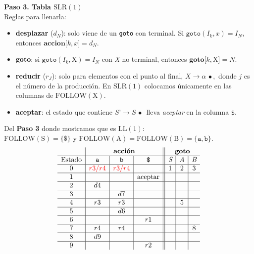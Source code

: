 \documentclass[12pt,letterpaper]{article}
\newcommand{\nt}[1]{\textit{#1}}
\newcommand{\tk}[1]{\texttt{#1}}
\newcommand{\tx}[1]{\text{#1}}
\newcommand{\Follow}[1]{\mathrm{FOLLOW}(#1)}
\renewcommand{\ll}{\mathrm{LL(1)}}
\newcommand{\slr}{\mathrm{SLR(1)}}
\newcommand{\conf}[1]{\textcolor{red}{#1}}
\begin{document}
\begin{enumerate}[label=\arabic*.]
  \textbf{Paso 3. Tabla $\slr$}\\
  Reglas para llenarla:

  \begin{itemize}
  \item \textbf{desplazar} ($d_N$): solo viene de un \texttt{goto} con terminal.
    Si $\texttt{goto}(I_k,x)=I_N$, entonces $\textbf{accion}\tk{[} k, x \tk{]} = d_N$.
    
  \item \textbf{goto}: si $\texttt{goto}(I_k,\tx{X}) = I_N$ con \nt{X} no terminal,
    entonces $\textbf{goto}\tk{[} k, \tx{X} \tk{]} = N$.
    
  \item \textbf{reducir} ($r_J$): solo para elementos con el punto al final, $\nt{X}\to\alpha\,\bullet$,\
    donde $j$ es el número de la producción. En $\slr$ colocamos únicamente en las columnas de $\Follow{\tx{X}}$.

  \item \textbf{aceptar}: el estado que contiene $\nt{S'}\to\nt{S}\,\bullet$\ lleva \textit{aceptar} en la
    columna \tk{\$}.
  \end{itemize}
  
  Del \textbf{Paso 3} donde mostramos que es $\ll$:\\
  $\Follow{\tx{S}} = \{\tk{\$}\}$ y $\Follow{\tx{A}} = \Follow{\tx{B}} = \{\tk{a}, \tk{b}\}$.
  \[
  \begin{array}{c|c|c|c||c|c|c}
    & \multicolumn{3}{c||}{\textbf{acción}} & \multicolumn{3}{c}{\textbf{goto}} \\ \hline
    \text{Estado} & \tk{a} & \tk{b} & \tk{\$} & \nt{S} & \nt{A} & \nt{B} \\ \hline
    0 & \conf{r3/r4} & \conf{r3/r4} &   & 1 & 2 & 3 \\ \hline
    1 &    &    & \text{aceptar} &   &   &   \\ \hline
    2 & d4 &    &    &   &   &   \\ \hline
    3 &    & d7 &    &   &   &   \\ \hline
    4 & r3 & r3 &    &   & 5 &   \\ \hline
    5 &    & d6 &    &   &   &   \\ \hline
    6 &    &    & r1 &   &   &   \\ \hline
    7 & r4 & r4 &    &   &   & 8 \\ \hline
    8 & d9 &    &    &   &   &   \\ \hline
    9 &    &    & r2 &   &   &   \\
  \end{array}
  \]


\end{enumerate}
\end{document}
